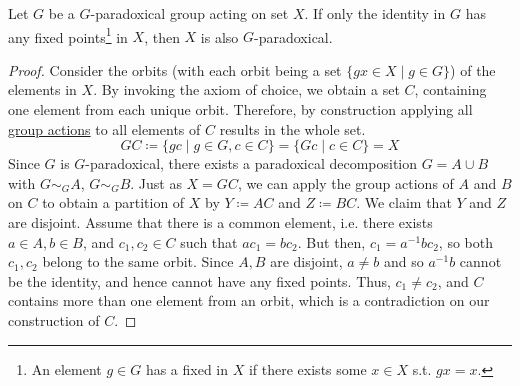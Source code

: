   \begin{theorem}
    \label{thm:lift}
    Let $G$ be a $G$-paradoxical group acting on set $X$. If only the identity in $G$ has any fixed points\footnote{An element $g \in G$ has a fixed in $X$ if there exists some $x \in X$ s.t. $gx = x$.} in $X$, then $X$ is also $G$-paradoxical. 
  \end{theorem}
  \begin{proof}
    Consider the orbits (with each orbit being a set $\{gx \in X \mid g \in G\}$) of the elements in $X$. By invoking the axiom of choice, we obtain a set $C$, containing one element from each unique orbit. Therefore, by construction applying all \hyperref[alg-def:group-action]{group actions} to all elements of $C$ results in the whole set. 
    \begin{equation}
      GC \coloneqq \{ gc \mid g \in G, c \in C \} = \{Gc \mid c \in C\} = X
    \end{equation}
    Since $G$ is $G$-paradoxical, there exists a paradoxical decomposition $G = A \cup B$ with $G \sim_G A$, $G \sim_G B$. Just as $X = GC$, we can apply the group actions of $A$ and $B$ on $C$ to obtain a partition of $X$ by $Y \coloneqq AC$ and $Z \coloneqq BC$. We claim that $Y$ and $Z$ are disjoint. Assume that there is a common element, i.e. there exists $a \in A, b \in B$, and $c_1, c_2 \in C$ such that $ac_1 = b c_2$. But then, $c_1 = a^{-1} b c_2$, so both $c_1, c_2$ belong to the same orbit. Since $A, B$ are disjoint, $a \neq b$ and so $a^{-1} b$ cannot  be the identity, and hence cannot have any fixed points. Thus, $c_1 \neq c_2$, and $C$ contains more than one element from an orbit, which is a contradiction on our construction of $C$. 


\end{proof}
